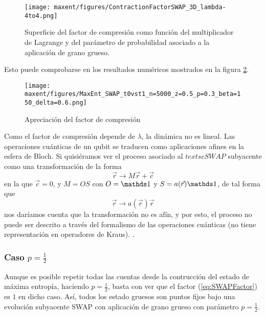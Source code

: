 \begin{figure}[h!]
\centering
\texttt{[image: maxent/figures/ContractionFactorSWAP\_3D\_lambda-4to4.png]}
\caption{Superficie del factor de compresión como función del multiplicador de Lagrange y del parámetro de probabilidad asociado a la aplicación de grano grueso. }
\label{fig:SWAPFactorSup}
\end{figure}
Esto puede comprobarse en los resultados numéricos mostrados en la figura \ref{fig:factornnum}.
\begin{figure}[h!]
\centering
\texttt{[image: maxent/figures/MaxEnt\_SWAP\_t0vst1\_n=5000\_z=0.5\_p=0.3\_beta=150\_delta=0.6.png]}
\caption{Apreciación del factor de compresión }
\label{fig:factornnum}
\end{figure}

Como el factor de compresión depende de $\lambda$, la dinámica no es lineal. Las operaciones cuánticas de un qubit se traducen como aplicaciones afines en la esfera de Bloch. Si quisiéramos ver el proceso asociado al $textsc{SWAP}$ subyacente como una transformación de la forma
\begin{equation*}
  \vec{r}\rightarrow M\vec{r}+\vec{c}
\end{equation*}
en la que $\vec{c}=0$, y $M=OS$ con $O=\Id$ y $S=a(\vec{r})\Id$, de tal forma que
\begin{equation*}
  \vec{r}\rightarrow a(\vec{r})\vec{r}
\end{equation*}
nos daríamos cuenta que la transformación no es afín, y por esto, el proceso no puede ser descrito a través del formalismo de las operaciones cuánticas (no tiene representación en operadores de Kraus). \cite{Chuang}.
\subsubsection{Caso $p=\frac{1}{2}$}

Aunque es posible repetir todas las cuentas desde la contrucción del estado de máxima entropía, haciendo $p=\frac{1}{2}$, basta con ver que el factor (\eqref{eq:SWAPFactor}) es $1$ en dicho caso. Así, todos los estado gruesos son puntos fijos bajo una evolución subyacente SWAP con aplicación de grano grueso con parámetro $p=\frac{1}{2}$.

